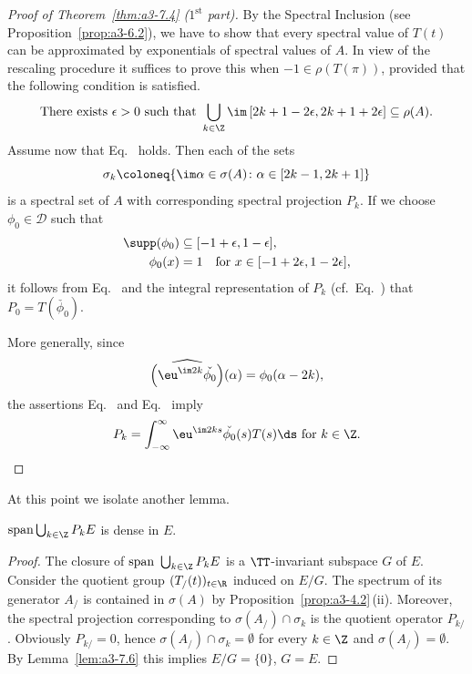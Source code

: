 \begin{proof}[Proof of Theorem~\ref{thm:a3-7.4} ($1^{\text{st}} $ part)]
By the Spectral Inclusion (see Proposition~\ref{prop:a3-6.2}), we have to show that every spectral value of\/ $T(t)$ can be approximated by exponentials of spectral values of\/ $A$.
In view of the rescaling procedure it suffices to prove this when $-1 \in \rho(T(\pi))$, provided that the following condition is satisfied.
\begin{equation}\label{eq:a3-7.4}
	\text{There exists } \epsilon > 0 \text{ such that } \bigcup_{k\in\Z} \im\,[2k+1-2\epsilon,2k+1+2\epsilon] \subseteq 	\rho(A) .
\end{equation}
Assume now that Eq.~ holds.
Then each of the sets 
\[
	\sigma_{k}\coloneq \{\im\alpha \in \sigma(A) \colon \alpha \in [2k-1,2k+1]\}
\] 
is a spectral set of\/ $A$ with corresponding spectral projection $P_{k}$.
If we choose $\phi_{0} \in \mathcal{D}$ such that 
\begin{align*}
	\supp(\phi_{0}) &\subseteq [-1+\epsilon,1-\epsilon], \\
	\phi_{0}(x) & = 1 \quad \text{for $x \in [-1 + 2\epsilon,1 - 2\epsilon]$}, 
\end{align*}
it follows from Eq.~ and the integral representation of\/ $P_{k}$ (cf.\ Eq.~) that $P_{0} = T(\check{\phi_{0}})$.

More generally, since %
\[
	\widehat{\left(\eu^{\im 2k}\check{\phi_{0}}\right)}(\alpha) = \phi_{0}(\alpha-2k) ,
\]
%
the assertions Eq.~ and Eq.~ imply
\begin{equation}\label{eq:a3-7.5}
P_{k} = \int_{-\infty}^{\infty} \eu^{\im 2ks}\check{\phi_{0}}(s)T(s)\ds \text{ for } k \in \Z .
\qedhere
\end{equation}
\end{proof}
At this point we isolate another lemma.
\begin{lemma}\label{lem:a3-7.7}
$\mathrm{span }\bigcup_{k\in\Z} P_{k}E$ is dense in $E$.
\end{lemma}
\begin{proof}
The closure of\/ $\text{span }\bigcup_{k\in\Z} P_{k}E$ is a $\TT$-invariant subspace $G$ of\/ $E$.
Consider the quotient group $(T_/(t))_{t\in\R}$ induced on $E/G$.
The spectrum of its generator $A_{/}$ is contained in $\sigma(A)$ by Proposition~\ref{prop:a3-4.2}\,(ii).
Moreover, the spectral projection corresponding to $\sigma(A_{/}) \cap \sigma_{k}$ is the quotient operator $P_{k/}$.
Obviously $P_{k/} = 0$, hence $\sigma(A_{/}) \cap \sigma_{k} = \emptyset$ for every $k \in \Z$ and $\sigma(A_{/}) = \emptyset$.
By Lemma~\ref{lem:a3-7.6} this implies $E/G = \{0\}$, \ie $G = E$.
\end{proof}
